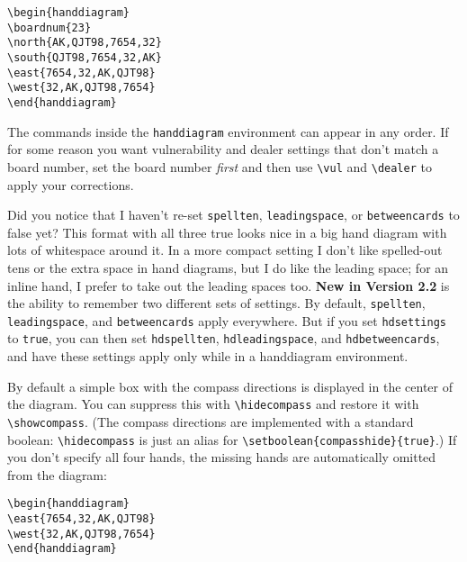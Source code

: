 \documentclass[10pt]{article}%
\newcommand{\gap}{\vspace{\baselineskip}}
\begin{document}
\noindent\verb+\begin{handdiagram}+\\
\verb+\boardnum{23}+\\
\verb+\north{AK,QJT98,7654,32}+\\
\verb+\south{QJT98,7654,32,AK}+\\
\verb+\east{7654,32,AK,QJT98}+\\
\verb+\west{32,AK,QJT98,7654}+\\
\verb+\end{handdiagram}+

\gap
\begin{handdiagram}
\end{handdiagram}
\gap

The commands inside the \verb+handdiagram+ environment can appear in any order. If for some reason you want vulnerability and dealer settings that don't match a board number, set the board number \textit{first} and then use \verb+\vul+ and \verb+\dealer+ to apply your corrections.

Did you notice that I haven't re-set \verb+spellten+, \verb+leadingspace+, or \verb+betweencards+ to false yet? This format with all three true looks nice in a big hand diagram with lots of whitespace around it. In a more compact setting I don't like spelled-out tens or the extra space in hand diagrams, but I do like the leading space; for an inline hand, I prefer to take out the leading spaces too. \textbf{New in Version 2.2} is the ability to remember two different sets of settings. By default, \verb+spellten+, \verb+leadingspace+, and \verb+betweencards+ apply everywhere. But if you set \verb+hdsettings+ to \verb+true+, you can then set \verb+hdspellten+, \verb+hdleadingspace+, and \verb+hdbetweencards+, and have these settings apply only while in a handdiagram environment. 

By default a simple box with the compass directions is displayed in the center of the diagram. You can suppress this with \verb+\hidecompass+ and restore it with \verb+\showcompass+. (The compass directions are implemented with a standard boolean: \verb+\hidecompass+ is just an alias for \verb+\setboolean{compasshide}{true}+.)
If you don't specify all four hands, the missing hands are automatically omitted from the diagram:

\noindent\verb+\begin{handdiagram}+\\
\verb+\east{7654,32,AK,QJT98}+\\
\verb+\west{32,AK,QJT98,7654}+\\
\verb+\end{handdiagram}+
\end{document}
